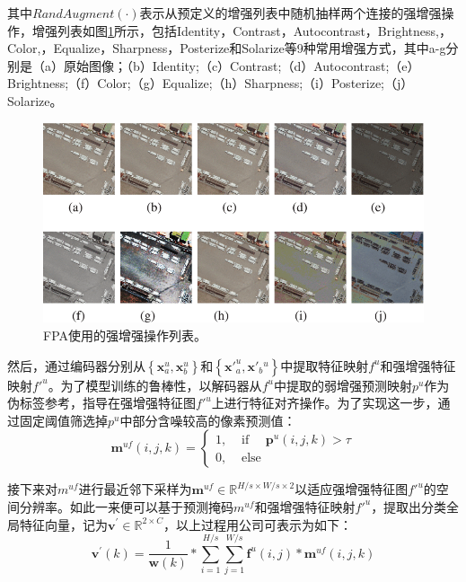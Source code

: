 \documentclass[lang=chs, degree=master, blindreview=false, adobe=false]{yanputhesis}
\begin{document}
其中$RandAugment(\cdot)$表示从预定义的增强列表中随机抽样两个连接的强增强操作，增强列表如图\ref{fig:FPAstrongAug}所示，包括Identity，Contrast，Autocontrast，Brightness,，Color,，Equalize，Sharpness，Posterize和Solarize等9种常用增强方式，其中a-g分别是（a）原始图像；（b）Identity;（c）Contrast;（d）Autocontrast;（e）Brightness;（f）Color;（g）Equalize;（h）Sharpness;（i）Posterize;（j）Solarize。
\begin{figure}[htb]
  \centering
  \includegraphics[scale=0.55]{images/Strong_aug.png}
  \caption{
    FPA使用的强增强操作列表\cite{Zhang2023FPA}。
  }
  \label{fig:FPAstrongAug}
\end{figure}

然后，通过编码器分别从$\left\{\mathbf{x}_{a}^{u}, \mathbf{x}_{b}^{u}\right\}$和$\left\{\mathbf{x'}_{a}^{u}, \mathbf{x'}_{b}{ }^{u}\right\}$中提取特征映射$f^u$和强增强特征映射$f'^u$。为了模型训练的鲁棒性，以解码器从$f^u$中提取的弱增强预测映射$p^u$作为伪标签参考，指导在强增强特征图$f'^u$上进行特征对齐操作。为了实现这一步，通过固定阈值筛选掉$p^u$中部分含噪较高的像素预测值：
\begin{equation}
  \label{eq:FPAthresh}
  \mathbf{m}^{u f}(i, j, k)=\left\{\begin{array}{ll}
    1, & \text { if } \quad \mathbf{p}^{u}(i, j, k)>\tau \\
    0, & \text { else }
    \end{array}\right.
\end{equation}

接下来对$m^{u f}$进行最近邻下采样为$\mathbf{m}^{u f} \in \mathbb{R}^{H / s \times W / s \times 2}$以适应强增强特征图$f'^u$的空间分辨率。如此一来便可以基于预测掩码$m^{u f}$和强增强特征映射$f'^u$，提取出分类全局特征向量，记为$\mathbf{v}^{\prime} \in \mathbb{R}^{2 \times C}$，以上过程用公司可表示为如下：
\begin{equation}
  \label{eq:FPAmetafeat}
  \mathbf{v}^{\prime}(k)=\frac{1}{\boldsymbol{w}(k)} * \sum_{i=1}^{H / s} \sum_{j=1}^{W / s} \mathbf{f}^{u}(i, j) * \mathbf{m}^{u f}(i, j, k)
\end{equation}
\end{document}
